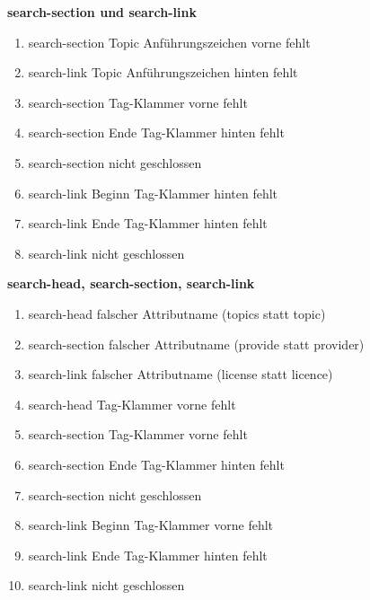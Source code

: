 \textbf{search-section und search-link} 
\begin{enumerate}
\item search-section Topic Anführungszeichen vorne fehlt
\item search-link Topic Anführungszeichen hinten fehlt
\item search-section Tag-Klammer vorne fehlt
\item search-section Ende  Tag-Klammer hinten fehlt
\item search-section nicht geschlossen
\item search-link Beginn Tag-Klammer hinten fehlt
\item search-link Ende  Tag-Klammer hinten fehlt
\item search-link nicht geschlossen
\end{enumerate}

\textbf{search-head, search-section, search-link}

\begin{enumerate}
\item search-head falscher Attributname (topics statt topic)
\item search-section falscher Attributname (provide statt provider)
\item search-link falscher Attributname (license statt licence)
\item search-head Tag-Klammer vorne fehlt
\item search-section Tag-Klammer vorne fehlt
\item search-section Ende  Tag-Klammer hinten fehlt
\item search-section nicht geschlossen
\item search-link Beginn Tag-Klammer vorne fehlt
\item search-link Ende  Tag-Klammer hinten fehlt
\item search-link nicht geschlossen
\end{enumerate}

